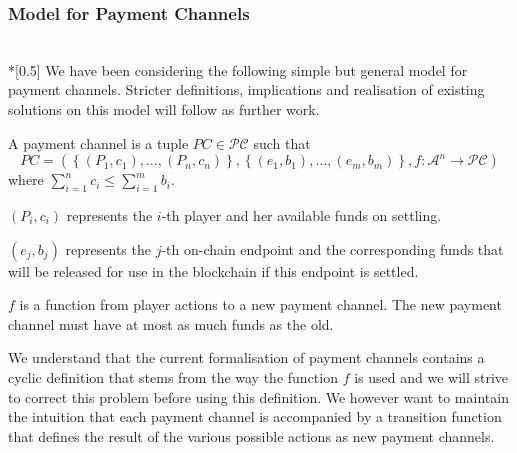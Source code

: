 \subsubsection{Model for Payment Channels} \ \\*[0.5\baselineskip]
  We have been considering the following simple but general model for payment channels.
  Stricter definitions, implications and realisation of existing solutions on this model
  will follow as further work.

  A payment channel is a tuple $PC \in \mathcal{PC}$ such that
  \begin{equation*}
    PC = \left(\left\{\left(P_1, c_1\right), \dots, \left(P_n, c_n\right)\right\},
    \left\{\left(e_1, b_1\right), \dots, \left(e_m, b_m\right)\right\}, f : \mathcal{A}^n
    \rightarrow \mathcal{PC}\right)
  \end{equation*}
  where $\sum\limits_{i = 1}^n c_i \leq \sum\limits_{i = 1}^m b_i$.

  $\left(P_i, c_i\right)$ represents the $i$-th player and her available funds on
  settling.

  $\left(e_j, b_j\right)$ represents the $j$-th on-chain endpoint and the corresponding
  funds that will be released for use in the blockchain if this endpoint is settled.

  $f$ is a function from player actions to a new payment channel. The new payment channel
  must have at most as much funds as the old.

  We understand that the current formalisation of payment channels contains a cyclic
  definition that stems from the way the function $f$ is used and we will strive to
  correct this problem before using this definition. We however want to maintain the
  intuition that each payment channel is accompanied by a transition function that defines
  the result of the various possible actions as new payment channels.
